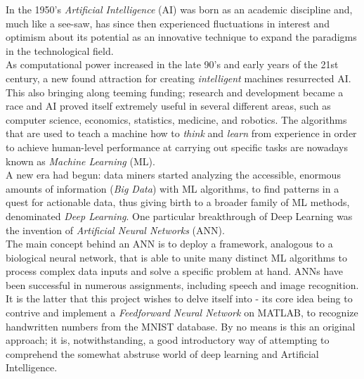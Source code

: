 In the 1950's \textit{Artificial Intelligence} (AI) was born as an academic discipline and, much like a see-saw, has since then experienced fluctuations in interest and optimism about its potential as an innovative technique to expand the paradigms in the technological field. \\
As computational power increased in the late 90's and early years of the 21st century, a new found attraction for creating \textit{intelligent} machines resurrected AI. This also bringing along teeming funding; research and development became a race and AI proved itself extremely useful in several different areas, such as computer science, economics, statistics, medicine, and robotics. The algorithms that are used to teach a machine how to \textit{think} and \textit{learn} from experience in order to achieve human-level performance at carrying out specific tasks are nowadays known as \textit{Machine Learning} (ML).\\
A new era had begun: data miners started analyzing the accessible, enormous amounts of information (\textit{Big Data}) with ML algorithms, to find patterns in a quest for actionable data, thus giving birth to a broader family of ML methods, denominated \textit{Deep Learning}. One particular breakthrough of Deep Learning was the invention of \textit{Artificial Neural Networks} (ANN). \\
The main concept behind an ANN is to deploy a framework, analogous to a biological neural network, that is able to unite many distinct ML algorithms to process complex data inputs and solve a specific problem at hand. ANNs have been successful in numerous assignments, including speech and image recognition. It is the latter that this project wishes to delve itself into - its core idea being to contrive and implement a \textit{Feedforward Neural Network} on MATLAB, to recognize handwritten numbers from the MNIST database. By no means is this an original approach; it is, notwithstanding, a good introductory way of attempting to comprehend the somewhat abstruse world of deep learning and Artificial Intelligence.
